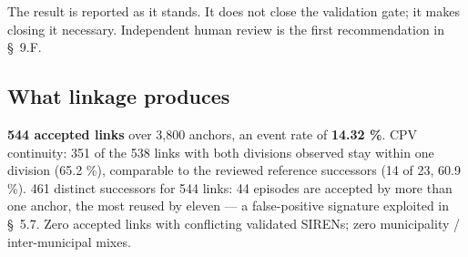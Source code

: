 The result is reported as it stands. It does not close the validation gate; it makes closing it necessary. Independent human review is the first recommendation in \S~9.F.

\subsection{What linkage produces}

\textbf{544 accepted links} over 3,800 anchors, an event rate of \textbf{14.32 \%}. CPV continuity: 351 of the 538 links with both divisions observed stay within one division (65.2 \%), comparable to the reviewed reference successors (14 of 23, 60.9 \%). 461 distinct successors for 544 links: 44 episodes are accepted by more than one anchor, the most reused by eleven --- a false-positive signature exploited in \S~5.7. Zero accepted links with conflicting validated SIRENs; zero municipality / inter-municipal mixes.
